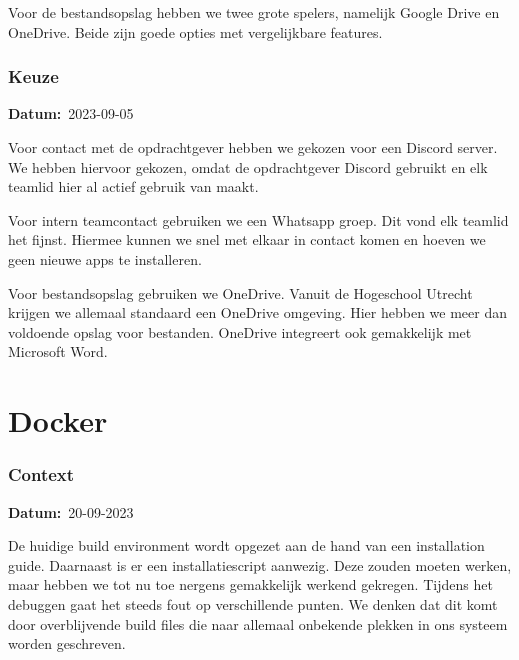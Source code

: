 \documentclass[a4paper]{report}
\newcommand{\teambox}{
  \begin{tcolorbox}[hbox, colback=blue!5!white,colframe=blue!75!black,
    left=.1mm, right=.1mm, top=.1mm, bottom=.1mm, fontupper=\scriptsize\sffamily]
    Team Keuze
  \end{tcolorbox}
}
\newcommand{\teamchoice}[1]{
  \section[ #1 ]{#1~\mbox{\raisebox{-2.5pt}{\teambox}}}
}
\newcommand{\timestamp}[1]{
  \mbox{\scriptsize \textbf{Datum:} #1} \smallbreak
}
\begin{document}
Voor de bestandsopslag hebben we twee grote spelers, namelijk Google Drive en OneDrive. 
Beide zijn goede opties met vergelijkbare features.

\subsubsection{Keuze}
\timestamp{2023-09-05}
Voor contact met de opdrachtgever hebben we gekozen voor een Discord server.
We hebben hiervoor gekozen, omdat de opdrachtgever Discord gebruikt en elk teamlid hier al actief gebruik van maakt.
\par \smallskip 
Voor intern teamcontact gebruiken we een Whatsapp groep. Dit vond elk teamlid het fijnst. Hiermee kunnen we snel met elkaar in contact komen en hoeven we geen nieuwe apps te installeren. 
\par \smallskip
Voor bestandsopslag gebruiken we OneDrive. Vanuit de Hogeschool Utrecht krijgen we allemaal standaard een OneDrive omgeving.
Hier hebben we meer dan voldoende opslag voor bestanden. OneDrive integreert ook gemakkelijk met Microsoft Word. 





\teamchoice{Docker}
\subsubsection{Context}
\timestamp{20-09-2023}
De huidige build environment wordt opgezet aan de hand van een installation guide.
Daarnaast is er een installatiescript aanwezig.
Deze zouden moeten werken, maar hebben we tot nu toe nergens gemakkelijk werkend gekregen.
Tijdens het debuggen gaat het steeds fout op verschillende punten. We denken dat dit komt door overblijvende build files die naar allemaal onbekende plekken in ons systeem worden geschreven.
\end{document}
